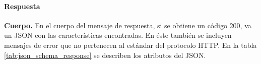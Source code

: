 

\paragraph{Respuesta}
\label{\detokenize{chapter_two/desc_cloudnao:respuesta}}

\textbf{Cuerpo.}
\label{\detokenize{chapter_two/desc_cloudnao:id1}}
En el cuerpo del mensaje de respuesta, si se obtiene un código 200,
va un JSON con las características encontradas. En éste también
se incluyen mensajes de error que no pertenecen al estándar del protocolo HTTP.
En la tabla \ref{tab:json_schema_response} se describen los atributos del JSON.

